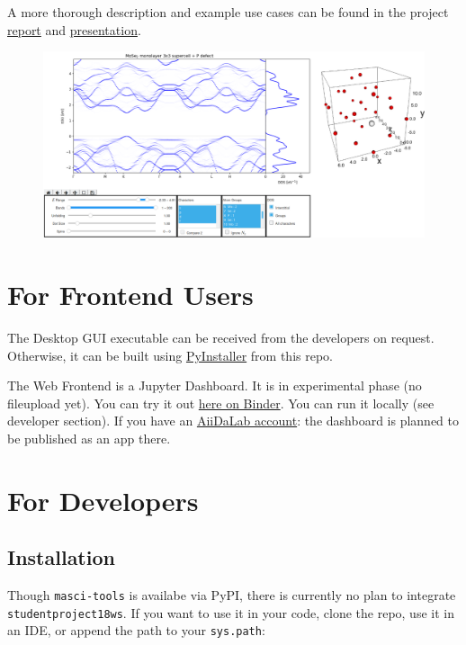 A more thorough description and example use cases can be found in the
project \href{./doc/report.pdf}{report} and
\href{./doc/presentation.pdf}{presentation}.

\begin{figure}
\centering
\includegraphics{./readme/web_frontend.png}
\caption{}
\end{figure}

\section{For Frontend Users}\label{for-frontend-users}

The Desktop GUI executable can be received from the developers on
request. Otherwise, it can be built using
\href{https://www.pyinstaller.org/}{PyInstaller} from this repo.

The Web Frontend is a Jupyter Dashboard. It is in experimental phase (no
fileupload yet). You can try it out
\href{https://mybinder.org/v2/gh/JuDFTteam/masci-tools/studentproject18ws?filepath=studentproject18w\%2Ffrontend\%2Fjupyter\%2Fdemo\%2Fbinder_demo.ipynb}{here
on Binder}. You can run it locally (see developer section). If you have
an \href{https://aiidalab.materialscloud.org/hub/login}{AiiDaLab
account}: the dashboard is planned to be published as an app there.

\section{For Developers}\label{for-developers}

\subsection{Installation}\label{installation}

Though \texttt{masci-tools} is availabe via PyPI, there is currently no
plan to integrate \texttt{studentproject18ws}. If you want to use it in
your code, clone the repo, use it in an IDE, or append the path to your
\texttt{sys.path}:

